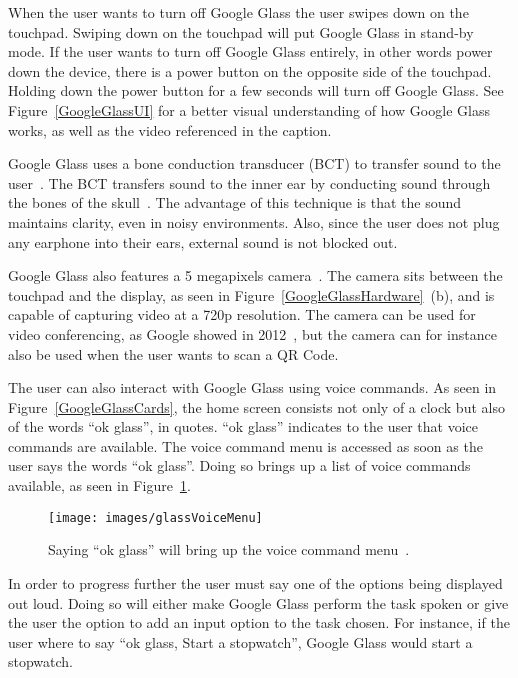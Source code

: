 When the user wants to turn off Google Glass the user swipes down on the touchpad. Swiping down on the touchpad will put Google Glass in stand-by mode. If the user wants to turn off Google Glass entirely, in other words power down the device, there is a power button on the opposite side of the touchpad. Holding down the power button for a few seconds will turn off Google Glass. See Figure~\ref{GoogleGlassUI} for a better visual understanding of how Google Glass works, as well as the video referenced in the caption.

Google Glass uses a bone conduction transducer (BCT) to transfer sound to the user~\cite{GlassSpecs}. The BCT transfers sound to the inner ear by conducting sound through the bones of the skull~\cite{boneConductionWiki}. The advantage of this technique is that the sound maintains clarity, even in noisy environments. Also, since the user does not plug any earphone into their ears, external sound is not blocked out.

Google Glass also features a 5 megapixels camera~\cite{GlassSpecs}. The camera sits between the touchpad and the display, as seen in Figure~\ref{GoogleGlassHardware}~(b), and is capable of capturing video at a 720p resolution. The camera can be used for video conferencing, as Google showed in 2012~\cite{glassLiveDemo}, but the camera can for instance also be used when the user wants to scan a QR Code.

The user can also interact with Google Glass using voice commands. As seen in Figure~\ref{GoogleGlassCards}, the home screen consists not only of a clock but also of the words ``ok glass'', in quotes. ``ok glass'' indicates to the user that voice commands are available. The voice command menu is accessed as soon as the user says the words ``ok glass''. Doing so brings up a list of voice commands available, as seen in Figure~\ref{voiceCommandMenu}.

	\begin{figure}[H]%
		\centering
		\texttt{[image: images/glassVoiceMenu]}
		\caption{Saying ``ok glass'' will bring up the voice command menu~\cite{googleGlassVoiceCommand}.}
		\label{voiceCommandMenu}
	\end{figure}

In order to progress further the user must say one of the options being displayed out loud. Doing so will either make Google Glass perform the task spoken or give the user the option to add an input option to the task chosen. For instance, if the user where to say ``ok glass, Start a stopwatch'', Google Glass would start a stopwatch.

